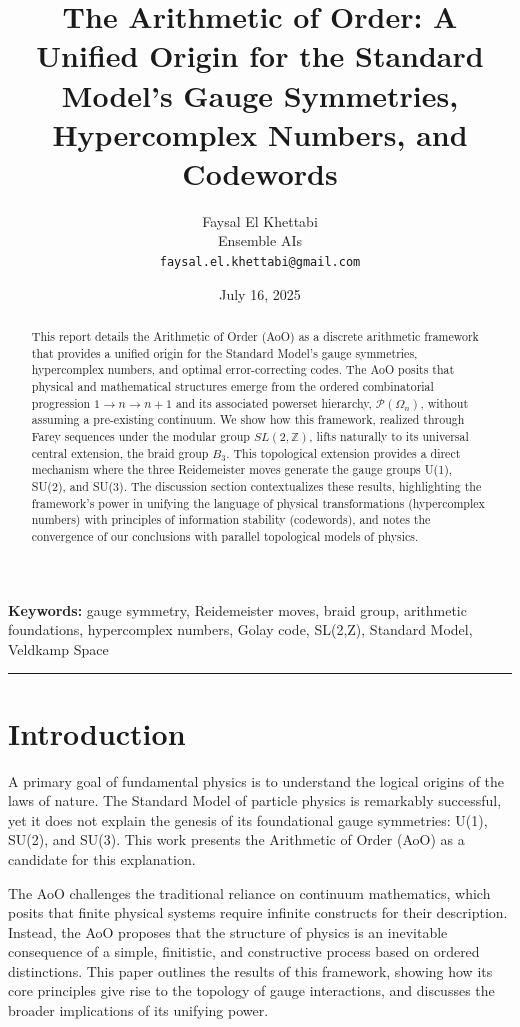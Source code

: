 \documentclass{article}
\title{The Arithmetic of Order: A Unified Origin for the Standard Model's Gauge Symmetries, Hypercomplex Numbers, and Codewords}
\author{
    Faysal El Khettabi \\
    Ensemble AIs \\
    \texttt{faysal.el.khettabi@gmail.com}
}
\date{July 16, 2025}
\theoremstyle{remark}
\begin{document}
\maketitle

\begin{abstract}
This report details the Arithmetic of Order (AoO) as a discrete arithmetic framework that provides a unified origin for the Standard Model's gauge symmetries, hypercomplex numbers, and optimal error-correcting codes. The AoO posits that physical and mathematical structures emerge from the ordered combinatorial progression $1 \to n \to n+1$ and its associated powerset hierarchy, $\mathcal{P}(\Omega_n)$, without assuming a pre-existing continuum. We show how this framework, realized through Farey sequences under the modular group $SL(2,\mathbb{Z})$, lifts naturally to its universal central extension, the braid group $B_3$. This topological extension provides a direct mechanism where the three Reidemeister moves generate the gauge groups U(1), SU(2), and SU(3). The discussion section contextualizes these results, highlighting the framework's power in unifying the language of physical transformations (hypercomplex numbers) with principles of information stability (codewords), and notes the convergence of our conclusions with parallel topological models of physics.
\end{abstract}

\vspace{1em}
\noindent\textbf{Keywords:} gauge symmetry, Reidemeister moves, braid group, arithmetic foundations, hypercomplex numbers, Golay code, SL(2,Z), Standard Model, Veldkamp Space

\hrule
\section{Introduction}
A primary goal of fundamental physics is to understand the logical origins of the laws of nature. The Standard Model of particle physics is remarkably successful, yet it does not explain the genesis of its foundational gauge symmetries: U(1), SU(2), and SU(3). This work presents the Arithmetic of Order (AoO) as a candidate for this explanation.

The AoO challenges the traditional reliance on continuum mathematics, which posits that finite physical systems require infinite constructs for their description. Instead, the AoO proposes that the structure of physics is an inevitable consequence of a simple, finitistic, and constructive process based on ordered distinctions. This paper outlines the results of this framework, showing how its core principles give rise to the topology of gauge interactions, and discusses the broader implications of its unifying power.
\end{document}
